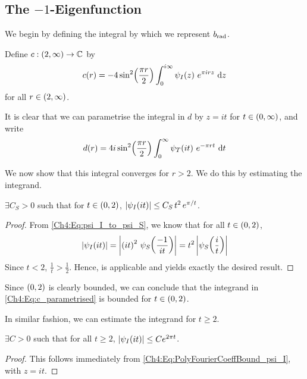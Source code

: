 \subsection{The $-1$-Eigenfunction}

We begin by defining the integral by which we represent $b_{\operatorname{rad}}$.

\begin{boxdefinition}
    Define $c : \left( 2, \infty \right) \to \mathbb{C}$ by
    \begin{align*}
        c\!\left( r \right) = -4 \sin^2\!\left( \frac{\pi r}{2} \right) \int_{0}^{i\infty} \psi_I\!\left( z \right) \, e^{\pi i r z} \, \operatorname{d}\!{z}
    \end{align*}
    for all $r \in \left( 2, \infty \right)$.
\end{boxdefinition}

It is clear that we can parametrise the integral in $d$ by $z = it$ for $t \in \left( 0, \infty \right)$, and write
\begin{align}
    d(r) = 4i \sin^2\!\left( \frac{\pi r}{2} \right) \int_{0}^{\infty} \psi_T\!\left( it \right) \, e^{-\pi r t} \, \operatorname{d}\!{t}
    \label{Ch4:Eq:c_parametrised}
\end{align}

We now show that this integral converges for $r > 2$. We do this by estimating the integrand.

\begin{boxlemma}
    $\exists C_S > 0$ such that for $t \in \left( 0, 2 \right)$, $\left\lvert \psi_I\!\left( it \right) \right\rvert \leq C_S \, t^2 \, e^{\pi / t}$.
\end{boxlemma}
\begin{proof}
    From \eqref{Ch4:Eq:psi_I_to_psi_S}, we know that for all $t \in \left( 0, 2 \right)$,
    \begin{align*}
        \left\lvert \psi_I\!\left( it \right) \right\rvert
        = \left\lvert \left( it \right)^2 \, \psi_S\!\left( \frac{-1}{it} \right) \right\rvert
        = t^2 \left\lvert \psi_S\!\left( \frac{i}{t} \right) \right\rvert
    \end{align*}
    Since $t < 2$, $\frac{1}{t} > \frac{1}{2}$. Hence,  is applicable and yields exactly the desired result.
\end{proof}

Since $\left( 0, 2 \right)$ is clearly bounded, we can conclude that the integrand in \eqref{Ch4:Eq:c_parametrised} is bounded for $t \in \left( 0, 2 \right)$.

In similar fashion, we can estimate the integrand for $t \geq 2$.

\begin{boxlemma}
    $\exists C > 0$ such that for all $t \geq 2$, $\left\lvert \psi_I\!\left( it \right) \right\rvert \leq C e^{2 \pi t}$.
\end{boxlemma}
\begin{proof}
    This follows immediately from \eqref{Ch4:Eq:PolyFourierCoeffBound_psi_I}, with $z = it$.
\end{proof}

